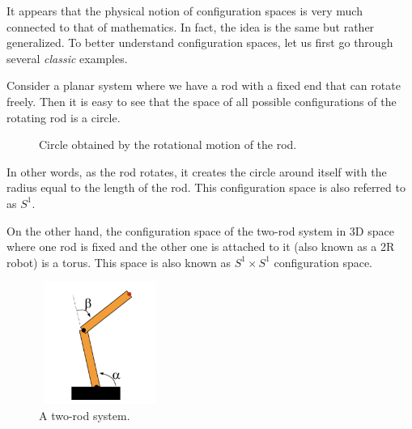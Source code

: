 \documentclass{article}
\theoremstyle{definition}
\begin{document}
\bigskip

It appears that the physical notion of configuration spaces is very much connected to that of mathematics.
In fact, the idea is the same but rather generalized. To better understand configuration spaces, let us
first go through several \textit{classic} examples.

\bigskip

\cite{1} Consider a planar system where we have a rod with a fixed end that can rotate freely. Then it is
easy to see that the space of all possible configurations of the rotating rod is a circle.

\begin{figure}[H]
\centering
{}
\caption*{Circle obtained by the rotational motion of the rod.}
\end{figure}

In other words, as the rod rotates, it creates the circle around itself
with the radius equal to the length of the rod. This configuration space
is also referred to as $S^1$.

\bigskip

\cite{2} On the other hand, the configuration space of the two-rod
system in 3D space where one rod is fixed and the other one is attached to it (also known as a 2R robot)
is a torus. This space is also known as $S^1 \times S^1$ configuration space.

\begin{figure}[H]
\centering
\includegraphics[width=4cm, height=4cm]{two-rod-system}
\caption*{A two-rod system.}
\end{figure}
\end{document}
